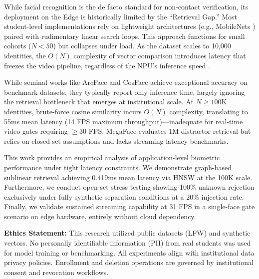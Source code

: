 \documentclass[conference]{IEEEtran}
\begin{document}
While facial recognition is the de facto standard for non-contact verification, its deployment on the Edge is historically limited by the ``Retrieval Gap.'' Most student-level implementations rely on lightweight architectures (e.g., MobileNets \cite{b4}) paired with rudimentary linear search loops. This approach functions for small cohorts ($N < 50$) but collapses under load. As the dataset scales to 10,000 identities, the $O(N)$ complexity of vector comparison introduces latency that freezes the video pipeline, regardless of the NPU's inference speed \cite{b2}.

While seminal works like ArcFace and CosFace achieve exceptional accuracy on benchmark datasets, they typically report only inference time, largely ignoring the retrieval bottleneck that emerges at institutional scale. At $N \ge 100$K identities, brute-force cosine similarity incurs $O(N)$ complexity, translating to 55ms mean latency (14 FPS maximum throughput)—inadequate for real-time video gates requiring $\ge$30 FPS. MegaFace evaluates 1M-distractor retrieval but relies on closed-set assumptions and lacks streaming latency benchmarks. 

This work provides an empirical analysis of application-level biometric performance under tight latency constraints. We demonstrate graph-based sublinear retrieval achieving 0.419ms mean latency via HNSW at the 100K scale. Furthermore, we conduct open-set stress testing showing 100\% unknown rejection exclusively under fully synthetic separation conditions at a 20\% injection rate. Finally, we validate sustained streaming capability at 31 FPS in a single-face gate scenario on edge hardware, entirely without cloud dependency.

\textbf{Ethics Statement:} This research utilized public datasets (LFW) and synthetic vectors. No personally identifiable information (PII) from real students was used for model training or benchmarking. All experiments align with institutional data privacy policies. Enrollment and deletion operations are governed by institutional consent and revocation workflows.
\end{document}

